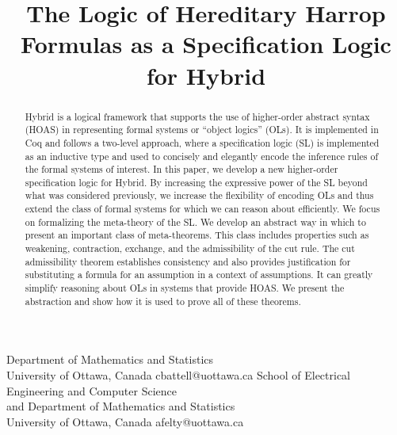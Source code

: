 \documentclass{sigplanconf}
\begin{document}
\setlength{\pdfpageheight}{\paperheight}
\setlength{\pdfpagewidth}{\paperwidth}




\title{The Logic of Hereditary Harrop Formulas as a Specification
  Logic for Hybrid}

           {Department of Mathematics and Statistics\\
            University of Ottawa, Canada}
           {cbattell@uottawa.ca}
           {School of Electrical Engineering and Computer Science\\
            and Department of Mathematics and Statistics\\
            University of Ottawa, Canada}
           {afelty@uottawa.ca}

\maketitle

\begin{abstract}
  Hybrid is a logical framework that supports the use of higher-order
  abstract syntax (HOAS) in representing formal systems or ``object
  logics'' (OLs).  It is implemented in Coq and follows a two-level
  approach, where a specification logic (SL) is implemented as an
  inductive type and used to concisely and elegantly encode the
  inference rules of the formal systems of interest.  In this paper,
  we develop a new higher-order specification logic for Hybrid.  By
  increasing the expressive power of the SL beyond what was considered
  previously, we increase the flexibility of encoding OLs and thus
  extend the class of formal systems for which we can reason about
  efficiently.  We focus on formalizing the meta-theory of the SL.
  We develop an abstract way in which to present an important class of
  meta-theorems.  This class includes
%
  properties such as weakening, contraction, exchange, and the
  admissibility of the cut rule.  The cut admissibility theorem
  establishes consistency and also provides justification for
  substituting a formula for an assumption in a context of
  assumptions.  It can greatly simplify reasoning about OLs in systems
  that provide HOAS.
  We present the abstraction and show how it is used to prove all of
  these theorems.
\end{abstract}
\end{document}
